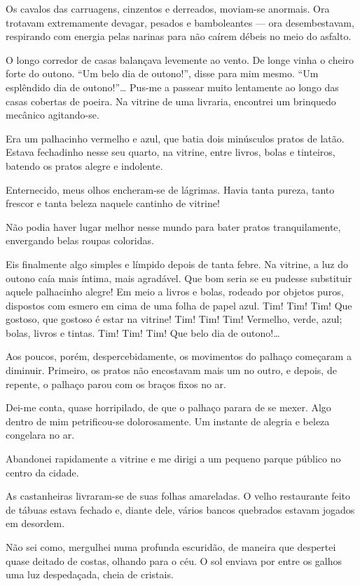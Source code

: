 Os cavalos das carruagens, cinzentos e derreados, moviam-se anormais. Ora trotavam extremamente devagar, pesados e bamboleantes --- ora desembestavam, respirando com energia pelas narinas para não caírem débeis no meio do asfalto.

O longo corredor de casas balançava levemente ao vento. De longe vinha o cheiro forte do outono. ``Um belo dia de outono!'', disse para mim mesmo. ``Um esplêndido dia de outono!''\ldots{}
Pus-me a passear muito lentamente ao longo das casas cobertas de poeira. Na vitrine de uma livraria, encontrei um brinquedo mecânico agitando-se.

Era um palhacinho vermelho e azul, que batia dois minúsculos pratos de latão. Estava fechadinho nesse seu quarto, na vitrine, entre livros, bolas e tinteiros, batendo os pratos alegre e indolente.

Enternecido, meus olhos encheram-se de lágrimas. Havia tanta pureza, tanto frescor e tanta beleza naquele cantinho de vitrine!

Não podia haver lugar melhor nesse mundo para bater pratos tranquilamente, envergando belas roupas coloridas.

Eis finalmente algo simples e límpido depois de tanta febre. Na vitrine, a luz do outono caía mais íntima, mais agradável. Que bom seria se eu pudesse substituir aquele palhacinho alegre! Em meio a livros e bolas, rodeado por objetos puros, dispostos com esmero em cima de uma folha de papel azul. Tim! Tim! Tim! Que gostoso, que gostoso é estar na vitrine! Tim! Tim! Tim! Vermelho, verde, azul; bolas, livros e tintas. Tim! Tim! Tim! Que belo dia de outono!\ldots{}

Aos poucos, porém, despercebidamente, os movimentos do palhaço começaram a diminuir. Primeiro, os pratos não encostavam mais um no outro, e depois, de repente, o palhaço parou com os braços fixos no ar.

Dei-me conta, quase horripilado, de que o palhaço parara de se mexer. Algo dentro de mim petrificou-se dolorosamente. Um instante de alegria e beleza congelara no ar.

Abandonei rapidamente a vitrine e me dirigi a um pequeno parque público no centro da cidade.

As castanheiras livraram-se de suas folhas amareladas. O velho restaurante feito de tábuas estava fechado e, diante dele, vários bancos quebrados estavam jogados em desordem.

Não sei como, mergulhei numa profunda escuridão, de maneira que despertei quase deitado de costas, olhando para o céu. O sol enviava por entre os galhos uma luz despedaçada, cheia de cristais.

